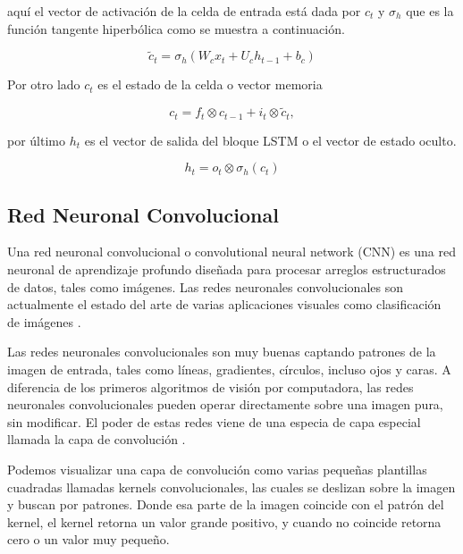 aquí el vector de activación de la celda de entrada está dada por $c_t$ y $\sigma_{h}$ que es la función tangente hiperbólica como se muestra a continuación.

\begin{equation}
	\tilde{c}_{t}=\sigma_{h}\left(W_{c} x_{t}+U_{c} h_{t-1}+b_{c}\right)
\end{equation}

Por otro lado $c_t$ es el estado de la celda o vector memoria

\begin{equation}
	c_{t}=f_{t} \otimes c_{t-1}+i_{t} \otimes \tilde{c}_{t},
\end{equation}

por último $h_t$ es el vector de salida del bloque LSTM o el vector de estado oculto. 

\begin{equation}
	h_{t}=o_{t} \otimes \sigma_{h}\left(c_{t}\right)
	\label{LSTM2}
\end{equation}



\subsection{Red Neuronal Convolucional}
Una red neuronal convolucional o convolutional neural network (CNN) es una red neuronal de aprendizaje profundo diseñada para procesar arreglos estructurados de datos, tales como imágenes. Las redes neuronales convolucionales son actualmente el estado del arte de varias aplicaciones visuales como clasificación de imágenes \parencite{ConvolutionalNeuralNetwork2019}.

Las redes neuronales convolucionales son muy buenas captando patrones de la imagen de entrada, tales como líneas, gradientes, círculos, incluso ojos y caras. A diferencia de los primeros algoritmos de visión por computadora, las redes neuronales convolucionales pueden operar directamente sobre una imagen pura, sin modificar. El poder de estas redes viene de una especia de capa especial llamada la capa de convolución \parencite{ConvolutionalNeuralNetwork2019}.

Podemos visualizar una capa de convolución como varias pequeñas plantillas cuadradas llamadas kernels convolucionales, las cuales se deslizan sobre la imagen y buscan por patrones. Donde esa parte de la imagen coincide con el patrón del kernel, el kernel retorna un valor grande positivo, y cuando no coincide retorna cero o un valor muy pequeño.

